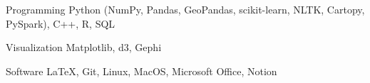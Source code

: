 \vspace{-2mm}
\begin{cvskills}
  \cvskill
    {Programming} %
    {Python (NumPy, Pandas, GeoPandas, scikit-learn, NLTK, Cartopy, PySpark), C++, R, SQL} %

  \cvskill
    {Visualization} %
    {Matplotlib, d3, Gephi}
    
  \cvskill
    {Software} %
    {\LaTeX, Git, Linux, MacOS, Microsoft Office, Notion}



\end{cvskills}
